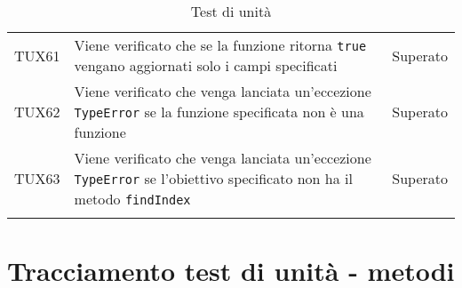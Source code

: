 \documentclass[PianoDiQualifica.tex]{subfiles}
\begin{document}
\begin{longtable}[H]{P{2cm}P{8.5cm}P{3cm}}
	TUX61 & Viene verificato che se la funzione ritorna \texttt{true} vengano aggiornati solo i campi specificati & Superato \\
	TUX62 & Viene verificato che venga lanciata un'eccezione \texttt{TypeError} se la funzione specificata non è una funzione & Superato \\
	TUX63 & Viene verificato che venga lanciata un'eccezione \texttt{TypeError} se l'obiettivo specificato non ha il metodo \texttt{findIndex} & Superato \\
	\hiderowcolors
	\caption{Test di unità}
\end{longtable}

\section{Tracciamento test di unità - metodi}
\end{document}
